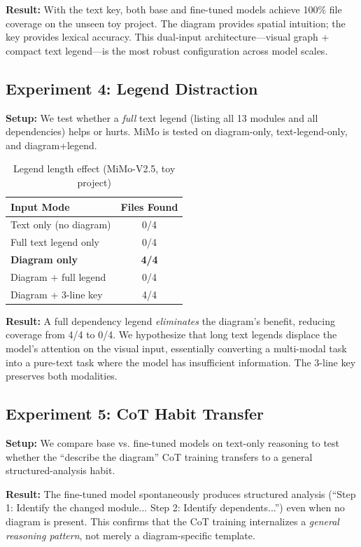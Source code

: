 \documentclass[11pt,a4paper]{article}
\begin{document}
\textbf{Result:} With the text key, both base and fine-tuned models achieve 100\% file coverage on the unseen toy project. The diagram provides spatial intuition; the key provides lexical accuracy. This dual-input architecture---visual graph + compact text legend---is the most robust configuration across model scales.

\subsection{Experiment 4: Legend Distraction}
\textbf{Setup:} We test whether a \textit{full} text legend (listing all 13 modules and all dependencies) helps or hurts. MiMo is tested on diagram-only, text-legend-only, and diagram+legend.
\bigskip

\begin{table}[h]
\centering
\caption{Legend length effect (MiMo-V2.5, toy project)}
\begin{tabular}{lc}
\toprule
Input Mode & Files Found \\
\midrule
Text only (no diagram) & 0/4 \\
Full text legend only & 0/4 \\
\textbf{Diagram only} & \textbf{4/4} \\
Diagram + full legend & 0/4 \\
Diagram + 3-line key & 4/4 \\
\bottomrule
\end{tabular}
\end{table}

\textbf{Result:} A full dependency legend \textit{eliminates} the diagram's benefit, reducing coverage from 4/4 to 0/4. We hypothesize that long text legends displace the model's attention on the visual input, essentially converting a multi-modal task into a pure-text task where the model has insufficient information. The 3-line key preserves both modalities.

\subsection{Experiment 5: CoT Habit Transfer}
\textbf{Setup:} We compare base vs. fine-tuned models on text-only reasoning to test whether the ``describe the diagram'' CoT training transfers to a general structured-analysis habit.
\bigskip

\noindent\textbf{Result:} The fine-tuned model spontaneously produces structured analysis (``Step 1: Identify the changed module... Step 2: Identify dependents...'') even when no diagram is present. This confirms that the CoT training internalizes a \textit{general reasoning pattern}, not merely a diagram-specific template.
\end{document}
